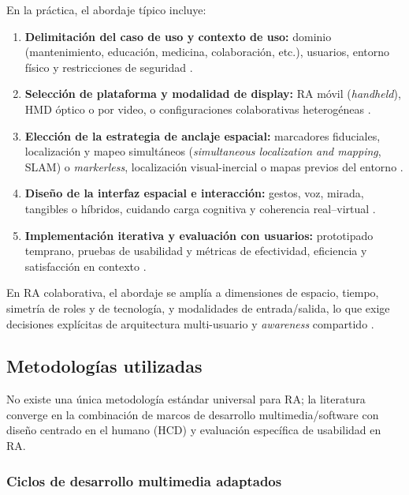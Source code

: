 \documentclass[conference]{IEEEtran}
\begin{document}
En la práctica, el abordaje típico incluye:

\begin{enumerate}
\item \textbf{Delimitación del caso de uso y contexto de uso:} dominio (mantenimiento, educación, medicina, colaboración, etc.), usuarios, entorno físico y restricciones de seguridad \cite{NIST2022,Sereno2022}.
\item \textbf{Selección de plataforma y modalidad de display:} RA móvil (\textit{handheld}), HMD óptico o por video, o configuraciones colaborativas heterogéneas \cite{Syed2023,Devagiri2024}.
\item \textbf{Elección de la estrategia de anclaje espacial:} marcadores fiduciales, localización y mapeo simultáneos (\textit{simultaneous localization and mapping}, SLAM) o \textit{markerless}, localización visual-inercial o mapas previos del entorno \cite{Kim2018,Syed2023}.
\item \textbf{Diseño de la interfaz espacial e interacción:} gestos, voz, mirada, tangibles o híbridos, cuidando carga cognitiva y coherencia real–virtual \cite{Kourouthanassis2015,Endsley2017}.
\item \textbf{Implementación iterativa y evaluación con usuarios:} prototipado temprano, pruebas de usabilidad y métricas de efectividad, eficiencia y satisfacción en contexto \cite{NIST2022,Dunser2011}.
\end{enumerate}

En RA colaborativa, el abordaje se amplía a dimensiones de espacio, tiempo, simetría de roles y de tecnología, y modalidades de entrada/salida, lo que exige decisiones explícitas de arquitectura multi-usuario y \textit{awareness} compartido \cite{Billinghurst2002,Sereno2022}.

\subsection{Metodologías utilizadas}

No existe una única metodología estándar universal para RA; la literatura converge en la combinación de marcos de desarrollo multimedia/software con diseño centrado en el humano (HCD) y evaluación específica de usabilidad en RA.

\subsubsection{Ciclos de desarrollo multimedia adaptados}
\end{document}

